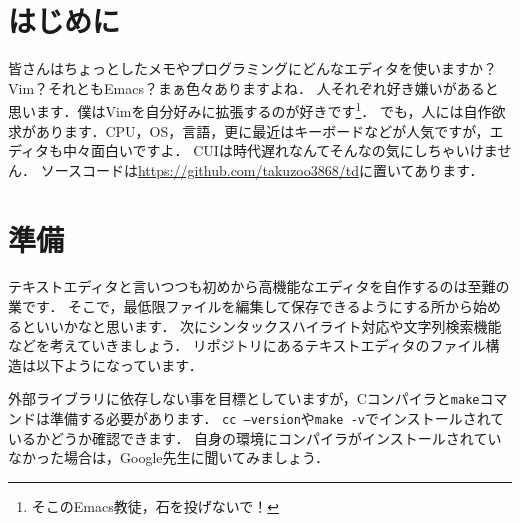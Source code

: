 \section{はじめに}
皆さんはちょっとしたメモやプログラミングにどんなエディタを使いますか？Vim？それともEmacs？まぁ色々ありますよね．
人それぞれ好き嫌いがあると思います．僕はVimを自分好みに拡張するのが好きです\footnote{そこのEmacs教徒，石を投げないで！}．
でも，人には自作欲求があります．CPU，OS，言語，更に最近はキーボードなどが人気ですが，エディタも中々面白いですよ．
CUIは時代遅れなんてそんなの気にしちゃいけません．
ソースコードは\url{https://github.com/takuzoo3868/td}に置いてあります．

\section{準備}
テキストエディタと言いつつも初めから高機能なエディタを自作するのは至難の業です．
そこで，最低限ファイルを編集して保存できるようにする所から始めるといいかなと思います．
次にシンタックスハイライト対応や文字列検索機能などを考えていきましょう．
リポジトリにあるテキストエディタのファイル構造は以下ようになっています．

\begin{figure}[H]
\end{figure}
外部ライブラリに依存しない事を目標としていますが，Cコンパイラと\texttt{make}コマンドは準備する必要があります．
\texttt{cc --version}や\texttt{make -v}でインストールされているかどうか確認できます．
自身の環境にコンパイラがインストールされていなかった場合は，Google先生に聞いてみましょう．

